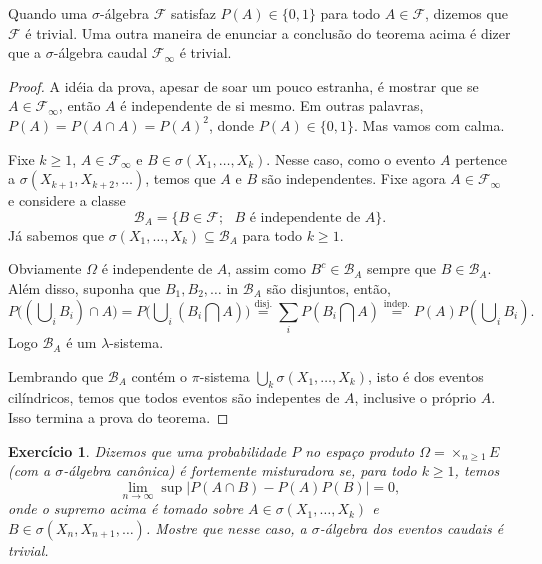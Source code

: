 \documentclass[reqno, draft]{book}
\newcommand*\1{\mathds{1}}
\newtheorem{exercise}[example]{Exercício}
\DeclareMathOperator*{\mcup}{{\textstyle \bigcup}}
\DeclareMathOperator*{\mcap}{{\textstyle \bigcap}}
\begin{document}
Quando uma $\sigma$-álgebra $\mathcal{F}$ satisfaz $P(A) \in \{0,1\}$ para todo $A \in \mathcal{F}$, dizemos que $\mathcal{F}$ é trivial. 
Uma outra maneira de enunciar a conclusão do teorema acima é dizer que a $\sigma$-álgebra caudal $\mathcal{F}_\infty$ é trivial.

\begin{proof}
  A idéia da prova, apesar de soar um pouco estranha, é mostrar que se $A \in \mathcal{F}_\infty$, então $A$ é independente de si mesmo.
  Em outras palavras, $P(A) = P(A \cap A) = P(A)^2$, donde $P(A) \in \{0,1\}$.
  Mas vamos com calma.

  Fixe $k \geq 1$, $A \in \mathcal{F}_\infty$ e $B \in \sigma(X_1, \dots, X_k)$.
  Nesse caso, como o evento $A$ pertence a $\sigma(X_{k+1}, X_{k+2}, \dots)$, temos que $A$ e $B$ são independentes.
  Fixe agora $A \in \mathcal{F}_\infty$ e considere a classe
  \begin{equation}
    \mathcal{B}_A = \{B \in \mathcal{F}; \text{ $B$ é independente de $A$}\}.
  \end{equation}
  Já sabemos que $\sigma(X_1, \dots, X_k) \subseteq \mathcal{B}_A$ para todo $k \geq 1$.

  Obviamente $\Omega$ é independente de $A$, assim como $B^c \in \mathcal{B}_A$ sempre que $B \in \mathcal{B}_A$.
  Além disso, suponha que $B_1, B_2, \dots$ in $\mathcal{B}_A$ são disjuntos, então,
  \begin{equation*}
    P\big( (\mcup_i B_i) \cap A \big) = P\big( \mcup_i (B_i \mcap A) \big) \overset{\text{disj.}}= \sum_i P(B_i \mcap A) \overset{\text{indep.}}= P(A) P(\mcup_i B_i).
  \end{equation*}
  Logo $\mathcal{B}_A$ é um $\lambda$-sistema.

  Lembrando que $\mathcal{B}_A$ contém o $\pi$-sistema $\bigcup_k \sigma(X_1, \dots, X_k)$, isto é dos eventos cilíndricos, temos que todos eventos são indepentes de $A$, inclusive o próprio $A$.
  Isso termina a prova do teorema.
\end{proof}

\begin{exercise}
  Dizemos que uma probabilidade $P$ no espaço produto $\Omega = \times_{n \geq 1} E$ (com a $\sigma$-álgebra canônica) é fortemente misturadora se, para todo $k \geq 1$, temos
  \begin{equation}
    \lim_{n \to \infty} \sup \big| P(A \cap B) - P(A) P(B) \big| = 0,
  \end{equation}
  onde o supremo acima é tomado sobre $A \in \sigma(X_1, \dots, X_k)$ e $B \in \sigma(X_n, X_{n+1}, \dots)$.
  Mostre que nesse caso, a $\sigma$-álgebra dos eventos caudais é trivial.
\end{exercise}
\end{document}
